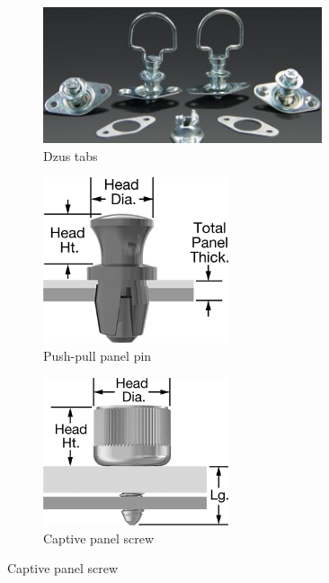 	\begin{figure}[H]
		\begin{subfigure}[b]{.35\linewidth}
			\includegraphics[width=0.9\textwidth]{imgs/dzus_tabs.jpeg}
			\caption{Dzus tabs}
		\end{subfigure}
		\begin{subfigure}[b]{.3\linewidth}
			\includegraphics[width=0.6\textwidth]{imgs/pushpull_panel_screw.png}
			\caption{Push-pull panel pin}
		\end{subfigure}
		\begin{subfigure}[b]{.3\linewidth}
			\includegraphics[width=0.6\textwidth]{imgs/panel_screw.png}
			\caption{Captive panel screw}
		\end{subfigure}
	\end{figure}
	
